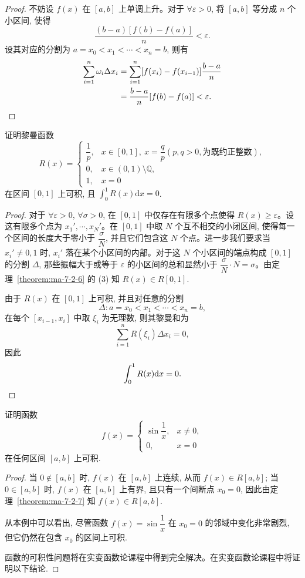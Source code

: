 \begin{proof}
不妨设 $f(x)$ 在 $[a,b]$ 上单调上升。对于 $\forall\varepsilon>0$, 将 $[a,b]$ 等分成 $n$ 个小区间, 使得
\[
  \frac{(b-a)[f(b)-f(a)]}{n}<\varepsilon.
\]
设其对应的分割为 $a=x_0<x_1<\cdots<x_n=b$, 则有
\[
\begin{aligned}
  \sum_{i=1}^n \omega_i\Delta x_i
  &=\sum_{i=1}^n [f(x_i)-f(x_{i-1})]\frac{b-a}{n}\\
  &=\frac{b-a}{n}[f(b)-f(a)]<\varepsilon.
\end{aligned}
\qedhere
\]
\end{proof}


\begin{example}\label{example:ma-7-2-2}
证明黎曼函数
\[
R(x)=
\begin{cases}
  \dfrac{1}{p}, & x\in[0,1],\ x=\dfrac{q}{p}(p,q>0,\text{为既约正整数}),\\
  0, & x\in(0,1)\setminus\mathbb Q,\\
  1, & x=0
\end{cases}
\]
在区间 $[0,1]$ 上可积, 且 $\int_0^1 R(x)\mathrm dx=0$.
\end{example}


\begin{proof}
对于 $\forall\varepsilon>0$, $\forall\sigma>0$, 在 $[0,1]$ 中仅存在有限多个点使得 $R(x)\geq\varepsilon$。设这有限多个点为 $x_1',\cdots,x_N'$。在 $[0,1]$ 中取 $N$ 个互不相交的小闭区间, 使得每一个区间的长度大于零小于 $\dfrac{\sigma}{N}$, 并且它们包含这 $N$ 个点。进一步我们要求当 $x_i'\neq0,1$ 时, $x_i'$ 落在某个小区间的内部。对于这 $N$ 个小区间的端点构成 $[0,1]$ 的分割 $\Delta$, 那些振幅大于或等于 $\varepsilon$ 的小区间的总和显然小于 $\dfrac{\sigma}{N}\cdot N=\sigma$。由定理~\ref{theorem:ma-7-2-6} 的 (3) 知 $R(x)\in R[0,1]$.

由于 $R(x)$ 在 $[0,1]$ 上可积, 并且对任意的分割
\[
  \Delta:a=x_0<x_1<\cdots<x_n=b,
\]
在每个 $[x_{i-1},x_i]$ 中取 $\xi_i$ 为无理数, 则其黎曼和为
\[
  \sum_{i=1}^n R(\xi_i)\Delta x_i=0,
\]
因此
\[
  \int_0^1 R(x)\mathrm dx=0.
\qedhere
\]
\end{proof}


\begin{example}\label{example:ma-7-2-3}
证明函数
\[
f(x)=
\begin{cases}
  \sin\dfrac{1}{x}, & x\neq0,\\
  0, & x=0
\end{cases}
\]
在任何区间 $[a,b]$ 上可积.
\end{example}


\begin{proof}
当 $0\notin[a,b]$ 时, $f(x)$ 在 $[a,b]$ 上连续, 从而 $f(x)\in R[a,b]$; 当 $0\in[a,b]$ 时, $f(x)$ 在 $[a,b]$ 上有界, 且只有一个间断点 $x_0=0$, 因此由定理~\ref{theorem:ma-7-2-7} 知 $f(x)\in R[a,b]$.

从本例中可以看出, 尽管函数 $f(x)=\sin\dfrac{1}{x}$ 在 $x_0=0$ 的邻域中变化非常剧烈, 但它仍然在包含 $x_0$ 的区间上可积.

函数的可积性问题将在实变函数论课程中得到完全解决。在实变函数论课程中将证明以下结论.
\end{proof}


